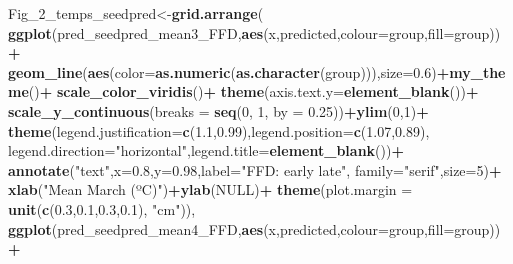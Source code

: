 \documentclass[
]{article}
\newenvironment{Shaded}{\begin{snugshade}}{\end{snugshade}}
\newcommand{\DataTypeTok}[1]{\textcolor[rgb]{0.13,0.29,0.53}{#1}}
\newcommand{\DecValTok}[1]{\textcolor[rgb]{0.00,0.00,0.81}{#1}}
\newcommand{\FloatTok}[1]{\textcolor[rgb]{0.00,0.00,0.81}{#1}}
\newcommand{\KeywordTok}[1]{\textcolor[rgb]{0.13,0.29,0.53}{\textbf{#1}}}
\newcommand{\NormalTok}[1]{#1}
\newcommand{\OperatorTok}[1]{\textcolor[rgb]{0.81,0.36,0.00}{\textbf{#1}}}
\newcommand{\OtherTok}[1]{\textcolor[rgb]{0.56,0.35,0.01}{#1}}
\newcommand{\StringTok}[1]{\textcolor[rgb]{0.31,0.60,0.02}{#1}}
\begin{document}
\begin{Shaded}
\begin{Highlighting}[]
\NormalTok{Fig\_}\DecValTok{2}\NormalTok{\_temps\_seedpred\textless{}{-}}\KeywordTok{grid.arrange}\NormalTok{(}
  \KeywordTok{ggplot}\NormalTok{(pred\_seedpred\_mean3\_FFD,}\KeywordTok{aes}\NormalTok{(x,predicted,}\DataTypeTok{colour=}\NormalTok{group,}\DataTypeTok{fill=}\NormalTok{group))}\OperatorTok{+}
\StringTok{    }\KeywordTok{geom\_line}\NormalTok{(}\KeywordTok{aes}\NormalTok{(}\DataTypeTok{color=}\KeywordTok{as.numeric}\NormalTok{(}\KeywordTok{as.character}\NormalTok{(group))),}\DataTypeTok{size=}\FloatTok{0.6}\NormalTok{)}\OperatorTok{+}\KeywordTok{my\_theme}\NormalTok{()}\OperatorTok{+}
\StringTok{    }\KeywordTok{scale\_color\_viridis}\NormalTok{()}\OperatorTok{+}
\StringTok{    }\KeywordTok{theme}\NormalTok{(}\DataTypeTok{axis.text.y=}\KeywordTok{element\_blank}\NormalTok{())}\OperatorTok{+}
\StringTok{    }\KeywordTok{scale\_y\_continuous}\NormalTok{(}\DataTypeTok{breaks =} \KeywordTok{seq}\NormalTok{(}\DecValTok{0}\NormalTok{, }\DecValTok{1}\NormalTok{, }\DataTypeTok{by =} \FloatTok{0.25}\NormalTok{))}\OperatorTok{+}\KeywordTok{ylim}\NormalTok{(}\DecValTok{0}\NormalTok{,}\DecValTok{1}\NormalTok{)}\OperatorTok{+}
\StringTok{    }\KeywordTok{theme}\NormalTok{(}\DataTypeTok{legend.justification=}\KeywordTok{c}\NormalTok{(}\FloatTok{1.1}\NormalTok{,}\FloatTok{0.99}\NormalTok{),}\DataTypeTok{legend.position=}\KeywordTok{c}\NormalTok{(}\FloatTok{1.07}\NormalTok{,}\FloatTok{0.89}\NormalTok{),}
        \DataTypeTok{legend.direction=}\StringTok{"horizontal"}\NormalTok{,}\DataTypeTok{legend.title=}\KeywordTok{element\_blank}\NormalTok{())}\OperatorTok{+}
\StringTok{    }\KeywordTok{annotate}\NormalTok{(}\StringTok{"text"}\NormalTok{,}\DataTypeTok{x=}\FloatTok{0.8}\NormalTok{,}\DataTypeTok{y=}\FloatTok{0.98}\NormalTok{,}\DataTypeTok{label=}\StringTok{"FFD: early          late"}\NormalTok{,}
             \DataTypeTok{family=}\StringTok{"serif"}\NormalTok{,}\DataTypeTok{size=}\DecValTok{5}\NormalTok{)}\OperatorTok{+}
\StringTok{    }\KeywordTok{xlab}\NormalTok{(}\StringTok{"Mean March (ºC)"}\NormalTok{)}\OperatorTok{+}\KeywordTok{ylab}\NormalTok{(}\OtherTok{NULL}\NormalTok{)}\OperatorTok{+}
\StringTok{    }\KeywordTok{theme}\NormalTok{(}\DataTypeTok{plot.margin =} \KeywordTok{unit}\NormalTok{(}\KeywordTok{c}\NormalTok{(}\FloatTok{0.3}\NormalTok{,}\FloatTok{0.1}\NormalTok{,}\FloatTok{0.3}\NormalTok{,}\FloatTok{0.1}\NormalTok{), }\StringTok{"cm"}\NormalTok{)),}
  \KeywordTok{ggplot}\NormalTok{(pred\_seedpred\_mean4\_FFD,}\KeywordTok{aes}\NormalTok{(x,predicted,}\DataTypeTok{colour=}\NormalTok{group,}\DataTypeTok{fill=}\NormalTok{group))}\OperatorTok{+}

\end{Highlighting}
\end{Shaded}
\end{document}
